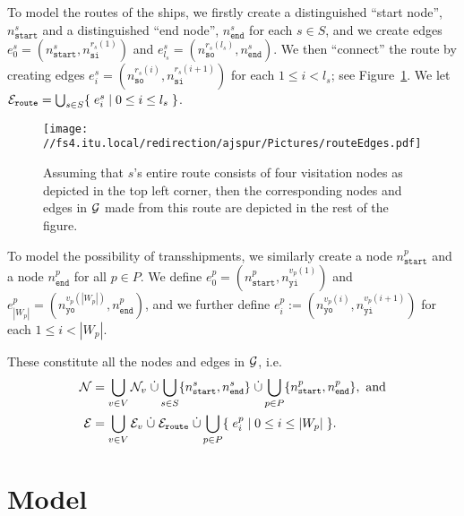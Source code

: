 To model the routes of the ships, we firstly create a distinguished ``start node'', $n^s_{\texttt{start}}$ and a distinguished ``end node'', $n^s_{\texttt{end}}$ for each $s \in S$, and we create edges $e^s_{0} = (n^s_{\texttt{start}}, n^{r_s(1)}_\texttt{si})$ and $e^s_{l_s} = (n^{r_s(l_s)}_\texttt{so}, n^s_{\texttt{end}})$. We then ``connect'' the route by creating edges $e^s_i= (n^{r_s(i)}_\texttt{so}, n^{r_s(i+1)}_\texttt{si})$ for each $1\leq i < l_s$; see Figure~\ref{fig:routeEdges}. 
We let $\mathcal{E}_{\texttt{route}} = \bigcup_{s\in S}\{\;{e^s_i}\;|\;{0\leq i \leq l_s}\;\}$. 

\begin{figure}[htbp]
	\centering
		\texttt{[image: //fs4.itu.local/redirection/ajspur/Pictures/routeEdges.pdf]}
	\caption{Assuming that $s$'s entire route consists of four visitation nodes as depicted in the top left corner, then the corresponding nodes and edges in $\mathcal{G}$ made from this route are depicted in the rest of the figure. 
	}
	\label{fig:routeEdges}
\end{figure}

To model the possibility of transshipments, we similarly create a node $n^p_{\texttt{start}}$ and a node $n^p_{\texttt{end}}$ for all $p\in P$.  
We define $e^p_0 = (n^p_{\texttt{start}}, n^{v_p(1)}_\texttt{yi})$ and $e^p_{|W_p|} = (n^{v_p(|W_p|)}_\texttt{yo}, n^p_{\texttt{end}})$, and we further define $e^p_i := (n^{v_p(i)}_\texttt{yo}, n^{v_p(i+1)}_\texttt{yi})$ for each $1\leq i < |W_p|$. 

These constitute all the nodes and edges in $\mathcal{G}$, i.e.  
\begin{align*}
\mathcal{N} &= \bigcup_{v\in V}\mathcal{N}_{v}\;\dot\cup\bigcup_{s\in S}\{n^s_{\texttt{start}}, n^s_{\texttt{end}}\}\;\dot\cup\bigcup_{p\in P}\{n^p_{\texttt{start}}, 
n^p_{\texttt{end}}\}, \text{ and}\\
\mathcal{E} &= \bigcup_{v\in V}\mathcal{E}_{v}\;\dot\cup\;\mathcal{E}_{\texttt{route}}\;\dot\cup\bigcup_{p\in P}\{\;{e^p_i}\;|\;{0\leq i \leq |W_p|}\;\}.
\end{align*}
\section*{Model}
